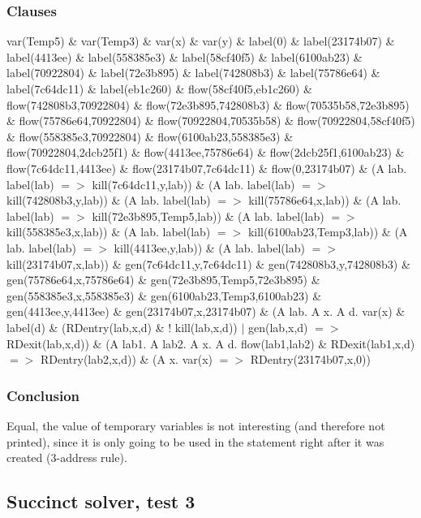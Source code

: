 \documentclass{report}
\begin{document}
\subsubsection{Clauses}
var(Temp5) \& var(Temp3) \& var(x) \& var(y) \& 
label(0) \& label(23174b07) \& label(4413ee) \& label(558385e3) \& label(58cf40f5) \& label(6100ab23) \& label(70922804) \& label(72e3b895) \& label(742808b3) \& label(75786e64) \& label(7c64dc11) \& label(eb1c260) \& 
flow(58cf40f5,eb1c260) \& flow(742808b3,70922804) \& flow(72e3b895,742808b3) \& flow(70535b58,72e3b895) \& flow(75786e64,70922804) \& flow(70922804,70535b58) \& flow(70922804,58cf40f5) \& flow(558385e3,70922804) \& flow(6100ab23,558385e3) \& flow(70922804,2dcb25f1) \& flow(4413ee,75786e64) \& flow(2dcb25f1,6100ab23) \& flow(7c64dc11,4413ee) \& flow(23174b07,7c64dc11) \& flow(0,23174b07) \& 
(A lab. label(lab) $=>$ kill(7c64dc11,y,lab)) \& (A lab. label(lab) $=>$ kill(742808b3,y,lab)) \& (A lab. label(lab) $=>$ kill(75786e64,x,lab)) \& (A lab. label(lab) $=>$ kill(72e3b895,Temp5,lab)) \& (A lab. label(lab) $=>$ kill(558385e3,x,lab)) \& (A lab. label(lab) $=>$ kill(6100ab23,Temp3,lab)) \& (A lab. label(lab) $=>$ kill(4413ee,y,lab)) \& (A lab. label(lab) $=>$ kill(23174b07,x,lab)) \& 
gen(7c64dc11,y,7c64dc11) \& gen(742808b3,y,742808b3) \& gen(75786e64,x,75786e64) \& gen(72e3b895,Temp5,72e3b895) \& gen(558385e3,x,558385e3) \& gen(6100ab23,Temp3,6100ab23) \& gen(4413ee,y,4413ee) \& gen(23174b07,x,23174b07) \& 
(A lab. A x. A d. var(x) \& label(d) \& (RDentry(lab,x,d) \& ! kill(lab,x,d)) $|$ gen(lab,x,d) $=>$ RDexit(lab,x,d)) \& 
(A lab1. A lab2. A x. A d. flow(lab1,lab2) \& RDexit(lab1,x,d) $=>$ RDentry(lab2,x,d)) \& 
(A x. var(x) $=>$ RDentry(23174b07,x,0))
\subsubsection{Conclusion}
Equal, the value of temporary variables is not interesting (and therefore not printed), since it is only going to be used in the statement right after it was created (3-address rule).

\subsection{Succinct solver, test 3}
\end{document}
